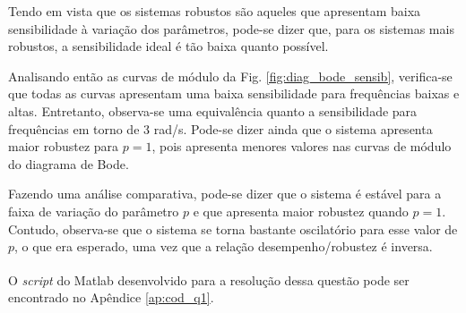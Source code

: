 Tendo em vista que os sistemas robustos são aqueles que apresentam baixa
sensibilidade à variação dos parâmetros, pode-se dizer que, para os sistemas
mais robustos, a sensibilidade ideal é tão baixa quanto possível.

Analisando então as curvas de módulo da Fig. \ref{fig:diag_bode_sensib},
verifica-se que todas as curvas apresentam uma baixa sensibilidade para
frequências baixas e altas. Entretanto, observa-se uma equivalência quanto a
sensibilidade para frequências em torno de 3 rad/s. Pode-se dizer ainda que o
sistema apresenta maior robustez para $p = 1$, pois apresenta menores valores
nas curvas de módulo do diagrama de Bode.

Fazendo uma análise comparativa, pode-se dizer que o sistema é estável para a
faixa de variação do parâmetro $p$ e que apresenta maior robustez quando $p =
1$. Contudo, observa-se que o sistema se torna bastante oscilatório para esse
valor de $p$, o que era esperado, uma vez que a relação desempenho/robustez é
inversa.

O {\it script} do Matlab\textsuperscript{\textregistered} desenvolvido para a
resolução dessa questão pode ser encontrado no Apêndice \ref{ap:cod_q1}.
